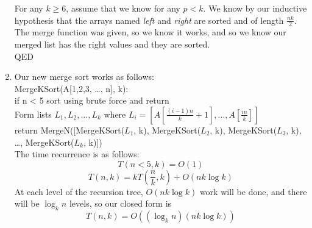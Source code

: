 \documentclass[11pt]{article}
\begin{document}
\begin{solution}
\begin{enumerate}
            For any $k \geq 6$, assume that we know for any $p < k$. We know by our inductive hypothesis that the arrays named \textit{left} and \textit{right} are sorted and of length $\frac{nk}{2}$. \\
            The merge function was given, so we know it works, and so we know our merged list has the right values and they are sorted. \\
            QED
        \item Our new merge sort works as follows: \\
            MergeKSort(A[1,2,3, \ldots, n], k): \\
            if n < 5 sort using brute force and return \\
            Form lists $L_1, L_2, \ldots, L_k$ where $L_i = [A[\frac{(i - 1)n}{k} + 1],\ldots,A[\frac{in}{k}]]$ \\
            return MergeN([MergeKSort($L_1$, k), MergeKSort($L_2$, k), MergeKSort($L_3$, k), \ldots, MergeKSort($L_k$, k)]) \\ 
            The time recurrence is as follows: 
            \[
                T(n < 5, k) = O(1)
            \]
            \[
                T(n, k) = kT(\frac{n}{k}, k) + O(nk \log k)
            \]
            At each level of the recursion tree, $O(nk\log k)$ work will be done, and there will be $\log_kn$ levels, so our closed form is 
            \[
                T(n, k) = O((\log_kn)(nk \log k))
            \]

    \end{enumerate}
\end{solution}

\end{document}
